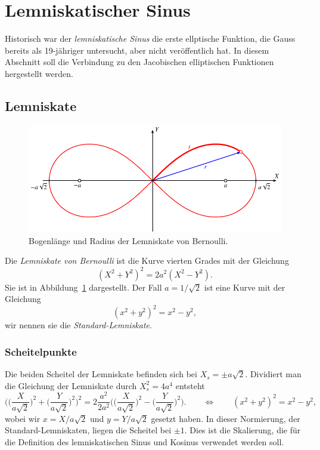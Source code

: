 %
%
%
\section{Lemniskatischer Sinus
\label{buch:elliptisch:section:lemniskate}}
Historisch war der {\em lemniskatische Sinus} die erste ellptische
Funktion, die Gauss bereits als 19-jähriger untersucht, aber nicht 
veröffentlich hat.
In diesem Abschnitt soll die Verbindung zu den Jacobischen
elliptischen Funktionen hergestellt werden.

%
%
\subsection{Lemniskate
\label{buch:gemotrie:subsection:lemniskate}}
\begin{figure}
\centering
\includegraphics{chapters/110-elliptisch/images/lemniskate.pdf}
\caption{Bogenlänge und Radius der Lemniskate von Bernoulli.
\label{buch:elliptisch:fig:lemniskate}}
\end{figure}
Die {\em Lemniskate von Bernoulli} ist die Kurve vierten Grades
mit der Gleichung
%
\begin{equation}
(X^2+Y^2)^2 = 2a^2(X^2-Y^2).
\label{buch:elliptisch:eqn:lemniskate}
\end{equation}
Sie ist in Abbildung~\ref{buch:elliptisch:fig:lemniskate}
dargestellt.
Der Fall $a=1/\sqrt{2}$ ist eine Kurve mit der Gleichung
\[
(x^2+y^2)^2 = x^2-y^2,
\]
wir nennen sie die {\em Standard-Lemniskate}.

\subsubsection{Scheitelpunkte}
Die beiden Scheitel der Lemniskate befinden sich bei $X_s=\pm a\sqrt{2}$.
Dividiert man die Gleichung der Lemniskate durch $X_s^2=4a^4$ entsteht 
\begin{equation}
\biggl(
\biggl(\frac{X}{a\sqrt{2}}\biggr)^2
+
\biggl(\frac{Y}{a\sqrt{2}}\biggr)^2
\biggr)^2
=
2\frac{a^2}{2a^2}\biggl(
\biggl(\frac{X}{a\sqrt{2}}\biggr)^2
-
\biggl(\frac{Y}{a\sqrt{2}}\biggr)^2
\biggr).
\qquad
\Leftrightarrow
\qquad
(x^2+y^2)^2 = x^2-y^2,
\label{buch:elliptisch:eqn:lemniskatenormiert}
\end{equation}
wobei wir $x=X/a\sqrt{2}$ und $y=Y/a\sqrt{2}$ gesetzt haben.
In dieser Normierung, der Standard-Lemniskaten, liegen die Scheitel
bei $\pm 1$.
Dies ist die Skalierung, die für die Definition des lemniskatischen
Sinus und Kosinus verwendet werden soll.

